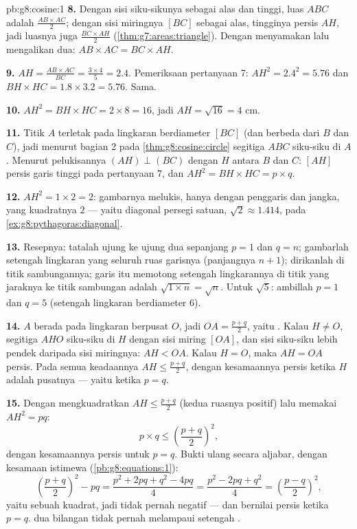 \begin{solution}{pb:g8:cosine:1}
\textbf{8.} Dengan sisi siku-sikunya sebagai alas dan tinggi, luas
$ABC$ adalah $\frac{AB \times AC}{2}$; dengan sisi miringnya $[BC]$
sebagai alas, tingginya persis $AH$, jadi luasnya juga
$\frac{BC \times AH}{2}$ (\cref{thm:g7:areas:triangle}). Dengan
menyamakan lalu mengalikan dua: $AB \times AC = BC \times AH$.

\textbf{9.} $AH = \frac{AB \times AC}{BC} = \frac{3 \times 4}{5}
= 2.4$. Pemeriksaan pertanyaan 7:
$AH^2 = 2.4^2 = 5.76$ dan
$BH \times HC = 1.8 \times 3.2 = 5.76$. Sama.

\textbf{10.} $AH^2 = BH \times HC = 2 \times 8 = 16$, jadi
$AH = \sqrt{16} = 4$ cm.

\textbf{11.} Titik $A$ terletak pada lingkaran berdiameter $[BC]$
(dan berbeda dari $B$ dan $C$), jadi menurut bagian 2 pada
\cref{thm:g8:cosine:circle} segitiga $ABC$ siku-siku di
$A$. Menurut pelukisannya $(AH) \perp (BC)$ dengan $H$ antara $B$ dan
$C$:  $[AH]$ persis garis tinggi pada pertanyaan 7,
dan $AH^2 = BH \times HC = p \times q$.

\textbf{12.} $AH^2 = 1 \times 2 = 2$: gambarnya melukis, hanya dengan
penggaris dan jangka,  yang kuadratnya $2$ --- yaitu
diagonal persegi satuan, $\sqrt2 \approx 1.414$, pada
\cref{ex:g8:pythagoras:diagonal}.

\textbf{13.} Resepnya: tatalah ujung ke ujung dua 
sepanjang $p = 1$ dan $q = n$; gambarlah setengah lingkaran yang
 seluruh ruas garisnya (panjangnya $n + 1$); dirikanlah
 di titik sambungannya; garis itu memotong setengah
lingkarannya di titik yang jaraknya ke titik sambungan adalah
$\sqrt{1 \times n} = \sqrt n$. Untuk $\sqrt5$: ambillah $p = 1$ dan
$q = 5$ (setengah lingkaran berdiameter $6$).

\textbf{14.} $A$ berada pada lingkaran berpusat $O$, jadi
$OA = \frac{p+q}{2}$, yaitu . Kalau $H \neq O$, segitiga
$AHO$ siku-siku di $H$ dengan sisi miring $[OA]$, dan sisi siku-siku
lebih pendek daripada sisi miringnya: $AH < OA$. Kalau $H = O$, maka
$AH = OA$ persis. Pada semua keadaannya $AH \leq \frac{p+q}{2}$,
dengan kesamaannya persis ketika $H$ adalah pusatnya --- yaitu ketika
$p = q$.

\textbf{15.} Dengan mengkuadratkan $AH \leq \frac{p+q}{2}$ (kedua
ruasnya positif) lalu memakai $AH^2 = pq$:
\[
p \times q \leq \left(\frac{p+q}{2}\right)^2 ,
\]
dengan kesamaannya persis untuk $p = q$. Bukti ulang secara aljabar,
dengan kesamaan istimewa (\cref{pb:g8:equations:1}):
\[
\left(\frac{p+q}{2}\right)^2 - pq
= \frac{p^2 + 2pq + q^2 - 4pq}{4}
= \frac{p^2 - 2pq + q^2}{4}
= \left(\frac{p-q}{2}\right)^2 ,
\]
yaitu sebuah kuadrat, jadi tidak pernah negatif --- dan bernilai 
persis ketika $p = q$.  dua bilangan tidak pernah
melampaui setengah .

\end{solution}

